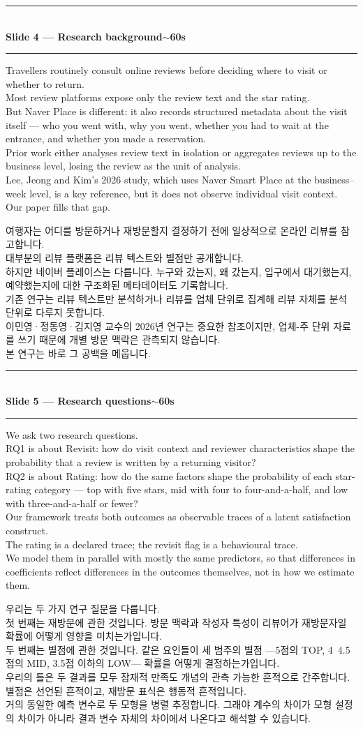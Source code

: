 \documentclass[10pt,a4paper]{article}
\newcommand{\sechead}[2]{%
  \vspace{6pt}%
  \noindent\rule{\linewidth}{0.6pt}\\[1pt]
  {\small\bfseries #1\hfill #2}\\[-3pt]
  \rule{\linewidth}{0.4pt}\par\vspace{2pt}%
}
\newcommand{\sent}[1]{#1\\[5pt]}
\newcommand{\bilingual}[2]{%
  \noindent%
  \begin{minipage}[t]{0.485\linewidth}
    \small #1
  \end{minipage}\hfill\vrule\hfill%
  \begin{minipage}[t]{0.483\linewidth}
    \small #2
  \end{minipage}\par\vspace{4pt}%
}
\begin{document}
\sechead{Slide 4 --- Research background}{$\sim$60s}

\bilingual{%
\sent{Travellers routinely consult online reviews before deciding where
to visit or whether to return.}
\sent{Most review platforms expose only the review text and the star
rating.}
\sent{But Naver Place is different: it also records structured metadata
about the visit itself --- who you went with, why you went, whether you
had to wait at the entrance, and whether you made a reservation.}
\sent{Prior work either analyses review text in isolation or aggregates
reviews up to the business level, losing the review as the unit of
analysis.}
\sent{Lee, Jeong and Kim's 2026 study, which uses Naver Smart Place at
the business--week level, is a key reference, but it does not observe
individual visit context.}
\sent{Our paper fills that gap.}
}{%
\sent{여행자는 어디를 방문하거나 재방문할지 결정하기 전에 일상적으로
온라인 리뷰를 참고합니다.}
\sent{대부분의 리뷰 플랫폼은 리뷰 텍스트와 별점만 공개합니다.}
\sent{하지만 네이버 플레이스는 다릅니다. 누구와 갔는지, 왜 갔는지,
입구에서 대기했는지, 예약했는지에 대한 구조화된 메타데이터도 기록합니다.}
\sent{기존 연구는 리뷰 텍스트만 분석하거나 리뷰를 업체 단위로 집계해
리뷰 자체를 분석 단위로 다루지 못합니다.}
\sent{이민영·정동영·김지영 교수의 2026년 연구는 중요한 참조이지만, 업체-주
단위 자료를 쓰기 때문에 개별 방문 맥락은 관측되지 않습니다.}
\sent{본 연구는 바로 그 공백을 메웁니다.}
}

\sechead{Slide 5 --- Research questions}{$\sim$60s}

\bilingual{%
\sent{We ask two research questions.}
\sent{RQ1 is about Revisit: how do visit context and reviewer
characteristics shape the probability that a review is written by a
returning visitor?}
\sent{RQ2 is about Rating: how do the same factors shape the probability
of each star-rating category --- top with five stars, mid with four to
four-and-a-half, and low with three-and-a-half or fewer?}
\sent{Our framework treats both outcomes as observable traces of a
latent satisfaction construct.}
\sent{The rating is a declared trace; the revisit flag is a behavioural
trace.}
\sent{We model them in parallel with mostly the same predictors, so that
differences in coefficients reflect differences in the outcomes
themselves, not in how we estimate them.}
}{%
\sent{우리는 두 가지 연구 질문을 다룹니다.}
\sent{첫 번째는 재방문에 관한 것입니다. 방문 맥락과 작성자 특성이
리뷰어가 재방문자일 확률에 어떻게 영향을 미치는가입니다.}
\sent{두 번째는 별점에 관한 것입니다. 같은 요인들이 세 범주의 별점
---5점의 TOP, 4~4.5점의 MID, 3.5점 이하의 LOW--- 확률을 어떻게 결정하는가입니다.}
\sent{우리의 틀은 두 결과를 모두 잠재적 만족도 개념의 관측 가능한
흔적으로 간주합니다.}
\sent{별점은 선언된 흔적이고, 재방문 표식은 행동적 흔적입니다.}
\sent{거의 동일한 예측 변수로 두 모형을 병렬 추정합니다. 그래야 계수의
차이가 모형 설정의 차이가 아니라 결과 변수 자체의 차이에서 나온다고
해석할 수 있습니다.}
}
\end{document}
